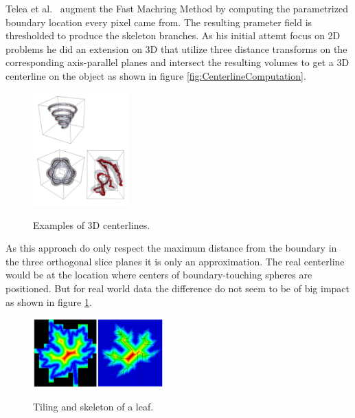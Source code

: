 Telea et al.~\cite{alexandru2002augmented} augment the Fast Machring Method by computing the parametrized boundary location every pixel came from. The resulting prameter field is thresholded to produce the skeleton branches.
As his initial attemt focus on 2D problems he did an extension on 3D that utilize three distance transforms on the corresponding axis-parallel planes and intersect the resulting volumes to get a 3D centerline on the object as shown in figure \ref{fig:CenterlineComputation}.

\begin{figure}[h]
	\centering
	\includegraphics[width=0.33\textwidth]{./Images/ExampleCenterlines_II.jpg} \\
	\caption{Examples of 3D centerlines.}
	\cite{alexandru2002augmented}
	\label{fig:ExampleCenterlines_II}
\end{figure} 

As this approach do only respect the maximum distance from the boundary in the three orthogonal slice planes it is only an approximation. The real centerline would be at the location where centers of boundary-touching spheres are positioned. But for real world data the difference do not seem to be of big impact as shown in figure \ref{fig:ExampleCenterlines_II}. 

\begin{figure}[h]
	\centering
	\includegraphics[width=0.45\textwidth]{./Images/LeafTilingAndDistanceTransform.jpg} \\
	\caption{Tiling and skeleton of a leaf.}
	\cite{strzodka2004generalized}
	\label{fig:LeafTilingAndDistanceTransform}
\end{figure} 

